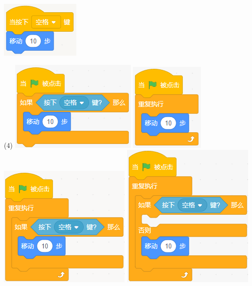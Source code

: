 \documentclass[10pt, a4paper]{article}
\begin{document}
\begin{enumerate}
        \begin{minipage}{.13\textwidth}
            \centering
            \includegraphics[width=\textwidth]{figure/15.png}
        \end{minipage}
        \begin{minipage}{.8\textwidth}
            \begin{tasks}(4)
                \task \includegraphics[width=.18\textwidth]{figure/15a.png}
                \task \includegraphics[width=.13\textwidth]{figure/15b.png}
                \task \includegraphics[width=.16\textwidth]{figure/15c.png}
                \task \includegraphics[width=.14\textwidth]{figure/15d.png}
            \end{tasks}
        \end{minipage}


\end{enumerate}
\end{document}
